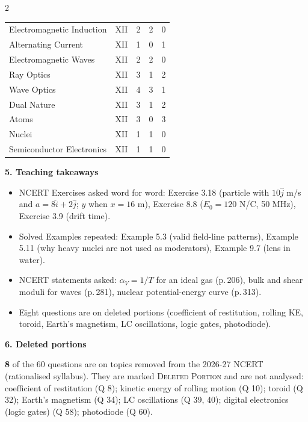 \begin{multicols}{2}
{\begin{tabular}{@{}p{4.7cm}c@{\,}r@{\,}r@{\,}r@{}}
Electromagnetic Induction & XII & 2 & 2 & 0\\
Alternating Current & XII & 1 & 0 & 1\\
Electromagnetic Waves & XII & 2 & 2 & 0\\
Ray Optics & XII & 3 & 1 & 2\\
Wave Optics & XII & 4 & 3 & 1\\
Dual Nature & XII & 3 & 1 & 2\\
Atoms & XII & 3 & 0 & 3\\
Nuclei & XII & 1 & 1 & 0\\
Semiconductor Electronics & XII & 1 & 1 & 0\\
\bottomrule\end{tabular}}\par\medskip
\textbf{\color{crimson}5. Teaching takeaways}\par\smallskip
{\footnotesize\begin{itemize}[leftmargin=1em,nosep]
\item NCERT Exercises asked word for word: Exercise 3.18 (particle with $10\hat j$ m/s and $a=8\hat i+2\hat j$; $y$ when $x=16$ m), Exercise 8.8 ($E_0=120$ N/C, 50 MHz), Exercise 3.9 (drift time).
\item Solved Examples repeated: Example 5.3 (valid field-line patterns), Example 5.11 (why heavy nuclei are not used as moderators), Example 9.7 (lens in water).
\item NCERT statements asked: $\alpha_V=1/T$ for an ideal gas (p.\,206), bulk and shear moduli for waves (p.\,281), nuclear potential-energy curve (p.\,313).
\item Eight questions are on deleted portions (coefficient of restitution, rolling KE, toroid, Earth's magnetism, LC oscillations, logic gates, photodiode).
\end{itemize}}\par\medskip
\textbf{\color{crimson}6. Deleted portions}\par\smallskip
\textbf{8} of the 60 questions are on topics removed from the 2026-27 NCERT (rationalised syllabus). They are marked \textsc{Deleted Portion} and are not analysed: coefficient of restitution (Q 8); kinetic energy of rolling motion (Q 10); toroid (Q 32); Earth's magnetism (Q 34); LC oscillations (Q 39, 40); digital electronics (logic gates) (Q 58); photodiode (Q 60).\par
\end{multicols}









